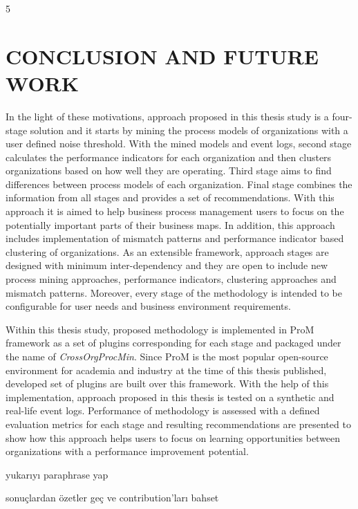 5 \chapter{CONCLUSION AND FUTURE WORK}
\label{chp:conclusion-and-future-work}



In the light of these motivations, approach proposed in this thesis study is a four-stage solution and it starts by mining the process models of organizations with a user defined noise threshold. With the mined models and event logs, second stage calculates the performance indicators for each organization and then clusters organizations based on how well they are operating. Third stage aims to find differences between process models of each organization. Final stage combines the information from all stages and provides a set of recommendations. With this approach it is aimed to help business process management users to focus on the potentially important parts of their business maps. In addition, this approach includes implementation of mismatch patterns and performance indicator based clustering of organizations. As an extensible framework, approach stages are designed with minimum inter-dependency and they are open to include new process mining approaches, performance indicators, clustering approaches and mismatch patterns. Moreover, every stage of the methodology is intended to be configurable for user needs and business environment requirements.

Within this thesis study, proposed methodology is implemented in ProM framework \cite{verbeek2010prom} as a set of plugins corresponding for each stage and packaged under the name of \textit{CrossOrgProcMin}. Since ProM is the most popular open-source environment for academia and industry at the time of this thesis published, developed set of plugins are built over this framework. With the help of this implementation, approach proposed in this thesis is tested on a synthetic and real-life event logs. Performance of methodology is assessed with a defined evaluation metrics for each stage and resulting recommendations are presented to show how this approach helps users to focus on learning opportunities between organizations with a performance improvement potential.

yukarıyı paraphrase yap

sonuçlardan özetler geç ve contribution'ları bahset


